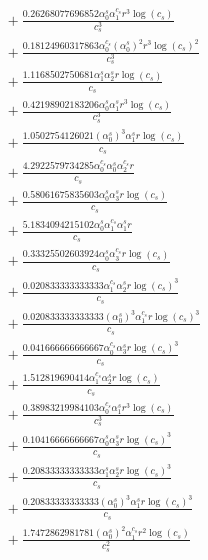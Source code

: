 \documentclass[10pt]{article}
\begin{document}
\begin{align*}
&{}  + \frac{0.26268077696852 \alpha_{0}^s \alpha_{1}^{c_s} r^{3} \log{\left(c_{s} \right)}}{c_{s}^{3}} \\
&{}  + \frac{0.18124960317863 \alpha_{0}^{c_s} \left(\alpha_{0}^s\right)^{2} r^{3} \log{\left(c_{s} \right)}^{2}}{c_{s}^{3}} \\
&{}  + \frac{1.1168502750681 \alpha_{1}^s \alpha_{2}^s r \log{\left(c_{s} \right)}}{c_{s}} \\
&{}  + \frac{0.42198902183206 \alpha_{0}^s \alpha_{1}^s r^{3} \log{\left(c_{s} \right)}}{c_{s}^{3}} \\
&{}  + \frac{1.0502754126021 \left(\alpha_{0}^s\right)^{3} \alpha_{1}^s r \log{\left(c_{s} \right)}}{c_{s}} \\
&{}  + \frac{4.2922579734285 \alpha_{0}^{c_s} \alpha_{0}^s \alpha_{2}^{c_s} r}{c_{s}} \\
&{}  + \frac{0.58061675835603 \alpha_{0}^s \alpha_{3}^s r \log{\left(c_{s} \right)}}{c_{s}} \\
&{}  + \frac{5.1834094215102 \alpha_{0}^s \alpha_{1}^{c_s} \alpha_{1}^s r}{c_{s}} \\
&{}  + \frac{0.33325502603924 \alpha_{0}^s \alpha_{3}^{c_s} r \log{\left(c_{s} \right)}}{c_{s}} \\
&{}  + \frac{0.020833333333333 \alpha_{1}^{c_s} \alpha_{2}^s r \log{\left(c_{s} \right)}^{3}}{c_{s}} \\
&{}  + \frac{0.020833333333333 \left(\alpha_{0}^s\right)^{3} \alpha_{1}^{c_s} r \log{\left(c_{s} \right)}^{3}}{c_{s}} \\
&{}  + \frac{0.041666666666667 \alpha_{0}^{c_s} \alpha_{3}^s r \log{\left(c_{s} \right)}^{3}}{c_{s}} \\
&{}  + \frac{1.512819690414 \alpha_{1}^{c_s} \alpha_{2}^s r \log{\left(c_{s} \right)}}{c_{s}} \\
&{}  + \frac{0.38983219984103 \alpha_{0}^{c_s} \alpha_{1}^s r^{3} \log{\left(c_{s} \right)}}{c_{s}^{3}} \\
&{}  + \frac{0.10416666666667 \alpha_{0}^s \alpha_{3}^s r \log{\left(c_{s} \right)}^{3}}{c_{s}} \\
&{}  + \frac{0.20833333333333 \alpha_{1}^s \alpha_{2}^s r \log{\left(c_{s} \right)}^{3}}{c_{s}} \\
&{}  + \frac{0.20833333333333 \left(\alpha_{0}^s\right)^{3} \alpha_{1}^s r \log{\left(c_{s} \right)}^{3}}{c_{s}} \\
&{}  + \frac{1.7472862981781 \left(\alpha_{0}^s\right)^{2} \alpha_{1}^{c_s} r^{2} \log{\left(c_{s} \right)}}{c_{s}^{2}} \\

\end{align*}
\end{document}
